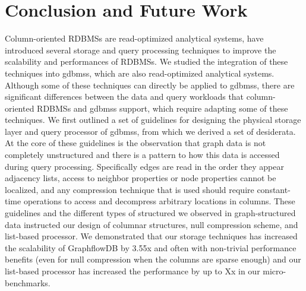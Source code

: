 \chapter{Conclusion and Future Work}
\label{c:conclusion-future-work}

Column-oriented RDBMSs are read-optimized analytical systems, have introduced several storage and query processing techniques to improve the scalability and performances of RDBMSs. We studied the integration of these techniques into \gls{gdbms}s, which are also read-optimized analytical systems. Although some of these techniques can directly be applied to \gls{gdbms}s, there are significant differences between the data and query workloads that column-oriented RDBMSs and  \gls{gdbms}s support, which require adapting some of these techniques. We first outlined a set of guidelines for designing the physical storage layer and query processor of \gls{gdbms}s, from which we derived a set of desiderata. At the core of these guidelines is the observation that graph data is not completely unstructured and there is a pattern to how this data is accessed during query processing. Specifically edges are read in the order they appear adjacency lists, access to neighbor properties or node properties cannot be localized, and any compression technique that is used should require constant-time operations to access and decompress arbitrary locations in columns. These guidelines and the different types of structured we observed in graph-structured data instructed our design of columnar structures, null compression scheme, and list-based processor. We demonstrated that our storage techniques has increased the scalability of GraphflowDB by 3.55x and often with non-trivial performance benefits (even for null compression when the columns are sparse enough) and our list-based processor has increased the performance by up to Xx  in our micro-benchmarks. 




